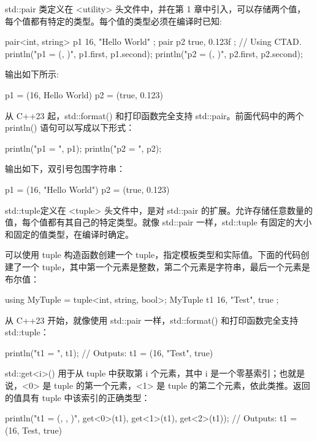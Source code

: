 
std::pair 类定义在 <utility> 头文件中，并在第 1 章中引入，可以存储两个值，每个值都有特定的类型。每个值的类型必须在编译时已知:

\begin{cpp}
pair<int, string> p1 { 16, "Hello World" };
pair p2 { true, 0.123f }; // Using CTAD.
println("p1 = ({}, {})", p1.first, p1.second);
println("p2 = ({}, {})", p2.first, p2.second);
\end{cpp}

输出如下所示:

\begin{shell}
p1 = (16, Hello World)
p2 = (true, 0.123)
\end{shell}

从 C++23 起，std::format() 和打印函数完全支持 std::pair。前面代码中的两个 println() 语句可以写成以下形式：

\begin{cpp}
println("p1 = {}", p1);
println("p2 = {}", p2);
\end{cpp}

输出如下，双引号包围字符串：

\begin{shell}
p1 = (16, "Hello World")
p2 = (true, 0.123)
\end{shell}

std::tuple定义在 <tuple> 头文件中，是对 std::pair 的扩展。允许存储任意数量的值，每个值都有其自己的特定类型。就像 std::pair 一样，std::tuple 有固定的大小和固定的值类型，在编译时确定。

可以使用 tuple 构造函数创建一个 tuple，指定模板类型和实际值。下面的代码创建了一个 tuple，其中第一个元素是整数，第二个元素是字符串，最后一个元素是布尔值：

\begin{cpp}
using MyTuple = tuple<int, string, bool>;
MyTuple t1 { 16, "Test", true };
\end{cpp}

从 C++23 开始，就像使用 std::pair 一样，std::format() 和打印函数完全支持 std::tuple：

\begin{cpp}
println("t1 = {}", t1);
// Outputs: t1 = (16, "Test", true)
\end{cpp}

std::get<i>() 用于从 tuple 中获取第 i 个元素，其中 i 是一个零基索引；也就是说，<0> 是 tuple 的第一个元素，<1> 是 tuple 的第二个元素，依此类推。返回的值具有 tuple 中该索引的正确类型：

\begin{cpp}
println("t1 = ({}, {}, {})", get<0>(t1), get<1>(t1), get<2>(t1));
// Outputs: t1 = (16, Test, true)
\end{cpp}

